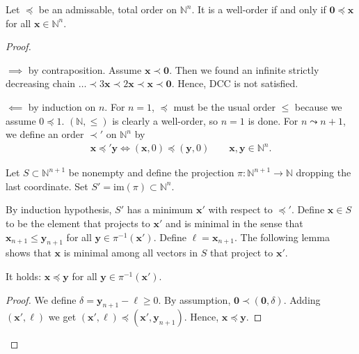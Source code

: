 \documentclass[a4paper, 11pt]{article}
\begin{document}
\begin{prop}
  Let \( \preceq \) be an admissable, total order on \( \mathbb N^n \). It is a well-order if and only if \(\mathbf 0 \preceq \mathbf x \) for all \( \mathbf x \in \mathbb N^n\).
\end{prop}

\begin{proof}\(  \)

  \( \implies \) by contraposition. Assume \(  \mathbf x \prec \mathbf 0 \). Then we found an infinite strictly decreasing chain \(\dots \prec 3 \mathbf x \prec 2 \mathbf x \prec \mathbf x \prec \mathbf 0\). Hence, DCC is not satisfied.

  \( \impliedby \) by induction on \( n \). For \( n = 1 \), \( \preceq \) must be the usual order \( \leq \) because we assume \( 0 \preceq 1 \). \( (\mathbb N, \leq) \) is clearly a well-order, so \( n=1 \) is done. For \( n \leadsto n+1 \), we define an order \( \prec' \) on \( \mathbb N^n \) by
    \begin{align*}
      \mathbf x \preceq' \mathbf y \iff  (\mathbf x,0) \preceq(\mathbf y,0) \qquad \mathbf x, \mathbf y \in \mathbb N^n.
    \end{align*}

  
  Let \( S \subset \mathbb N^{n+1} \) be nonempty and define the projection \( \pi: \mathbb N^{n+1} \to \mathbb N \) dropping the last coordinate. Set \( S' = \mathrm{im}(\pi) \subset \mathbb N^n \).
  
  By induction hypothesis, \( S' \) has a minimum \( \mathbf x' \) with respect to \( \preceq' \). Define \( \mathbf x \in S \) to be the element that projects to \( \mathbf x' \) and is minimal in the sense that \( \mathbf x_{n+1} \leq \mathbf y_{n+1} \) for all \( \mathbf y \in \pi^{-1}(\mathbf x') \). Define \( \ell = \mathbf x_{n+1} \). The following lemma shows that \( \mathbf x \) is minimal among all vectors in \( S \) that project to \( \mathbf x' \).
    
  \begin{lemma*}
    It holds: \( \mathbf x \preceq \mathbf y \) for all \( \mathbf y \in \pi^{-1}(\mathbf x') \).
  \end{lemma*}
  \begin{proof}
    We define \( \delta = \mathbf y_{n+ 1} - \ell \geq 0 \). By assumption, \( \mathbf 0 \prec  (\mathbf 0,\delta)  \). Adding \( (\mathbf x',\ell) \) we get \( (\mathbf x', \ell) \preceq (\mathbf x',\mathbf y_{n+1}) \). Hence, \( \mathbf x \preceq \mathbf y \).
  \end{proof}
  

\end{proof}
\end{document}
